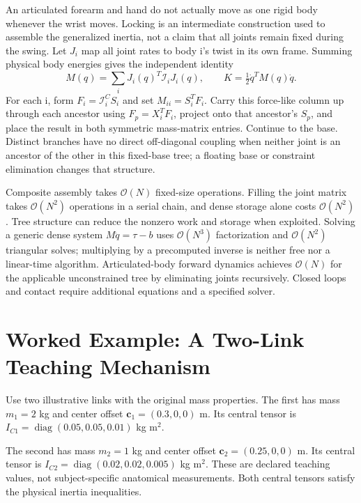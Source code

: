 An articulated forearm and hand do not actually move as one rigid body whenever the wrist moves. Locking is an intermediate construction used to assemble the generalized inertia, not a claim that all joints remain fixed during the swing. Let $J_i$ map all joint rates to body i's twist in its own frame. Summing physical body energies gives the independent identity
\begin{equation}
M(q)=\sum_i J_i(q)^T\mathcal I_i J_i(q),\qquad
K=\tfrac12\dot q^T M(q)\dot q.
\end{equation}
For each i, form $F_i=\mathcal I_i^C S_i$ and set $M_{ii}=S_i^T F_i$. Carry this force-like column up through each ancestor using $F_p=X_i^TF_i$, project onto that ancestor's $S_p$, and place the result in both symmetric mass-matrix entries. Continue to the base. Distinct branches have no direct off-diagonal coupling when neither joint is an ancestor of the other in this fixed-base tree; a floating base or constraint elimination changes that structure.

\label{thm:crb_complexity}
Composite assembly takes $\mathcal O(N)$ fixed-size operations. Filling the joint matrix takes $\mathcal O(N^2)$ operations in a serial chain, and dense storage alone costs $\mathcal O(N^2)$. Tree structure can reduce the nonzero work and storage when exploited. Solving a generic dense system $M\ddot q=\tau-b$ uses $\mathcal O(N^3)$ factorization and $\mathcal O(N^2)$ triangular solves; multiplying by a precomputed inverse is neither free nor a linear-time algorithm. Articulated-body forward dynamics achieves $\mathcal O(N)$ for the applicable unconstrained tree by eliminating joints recursively. Closed loops and contact require additional equations and a specified solver.

\section[Worked Example: A Two-Link Teaching Mechanism]{Worked Example: A Two-Link\\Teaching Mechanism}
\label{sec:worked_example_multi_inertia}

Use two illustrative links with the original mass properties. The first has mass $m_1=2$ kg and center offset $\mathbf c_1=(0.3,0,0)$ m. Its central tensor is $I_{C1}=\operatorname{diag}(0.05,0.05,0.01)$ kg m$^2$.

The second has mass $m_2=1$ kg and center offset $\mathbf c_2=(0.25,0,0)$ m. Its central tensor is $I_{C2}=\operatorname{diag}(0.02,0.02,0.005)$ kg m$^2$. These are declared teaching values, not subject-specific anatomical measurements. Both central tensors satisfy the physical inertia inequalities.

